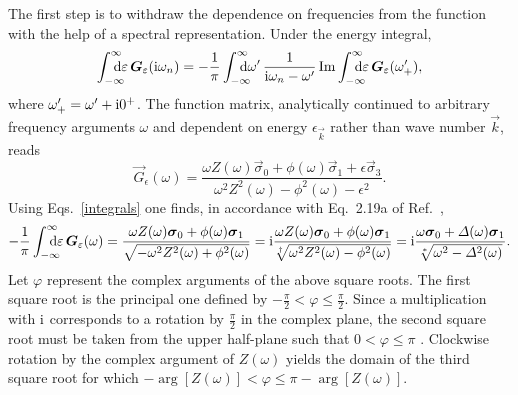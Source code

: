 The first step is to withdraw the dependence on  frequencies
from the  function with the help of a spectral representation. Under
the energy integral,
%
\begin{equation*}
    \int \from{-\infty} \till \infty \D \epsilon \, \vec G_\epsilon(\I \omega_n)
    = -\frac 1 \pi
    \int \from{-\infty} \till \infty \D \omega' \,
    \frac 1 {\I \omega_n - \omega'}
    \Im \int \from{-\infty} \till \infty \D \epsilon \,
    \vec G_\epsilon(\omega'_+),
\end{equation*}
%
where $\omega'_+ = \omega' + \mathrm i 0^+$. The  function matrix,
analytically continued to arbitrary frequency arguments $\omega$ and dependent
on energy $\epsilon_{\vec k}$ rather than wave number $\vec k$, reads
%
\begin{equation*}
    \vec G_\epsilon(\omega) = \frac
        { \omega Z(\omega) \vec \sigma_0
        + \phi(\omega) \vec \sigma_1
        + \epsilon \vec \sigma_3 }
        { \omega^2 Z^2(\omega)
        - \phi^2(\omega)
        - \epsilon^2}.
\end{equation*}
%
Using Eqs.~\ref{integrals} one finds, in accordance with Eq.~2.19a of
Ref.~,
%
\begin{equation*}
    -\frac 1 \pi \int \from{-\infty} \till \infty \D \epsilon \,
    \vec G_\epsilon(\omega)
    = \frac
        {\omega Z(\omega) \vec \sigma_0 + \phi(\omega) \vec \sigma_1}
        {\sqrt{-\omega^2 Z^2(\omega) + \phi^2(\omega)}}
    = \I \frac
        {\omega Z(\omega) \vec \sigma_0 + \phi(\omega) \vec \sigma_1}
        {\sqrt[\dagger]{\omega^2 Z^2(\omega) - \phi^2(\omega)}}
    = \I \frac
        {\omega \vec \sigma_0 + \Delta(\omega) \vec \sigma_1}
        {\sqrt[*]{\omega^2 - \Delta^2(\omega)}}.
\end{equation*}
%
Let $\varphi$ represent the complex arguments of the above square roots. The
first square root is the principal one defined by $-\frac \pi 2 < \varphi \leq
\frac \pi 2$. Since a multiplication with $\mathrm i$ corresponds to a rotation by
$\frac \pi 2$ in the complex plane, the second square root must be taken from
the upper half-plane such that $0 < \varphi \leq \pi$
\cite[Eq.~2.19b]{ScalapinoSchriefferWilkins66}. Clockwise rotation by the
complex argument of $Z(\omega)$ yields the domain of the third square root for
which $-\arg[Z(\omega)] < \varphi \leq \pi - \arg[Z(\omega)]$.

